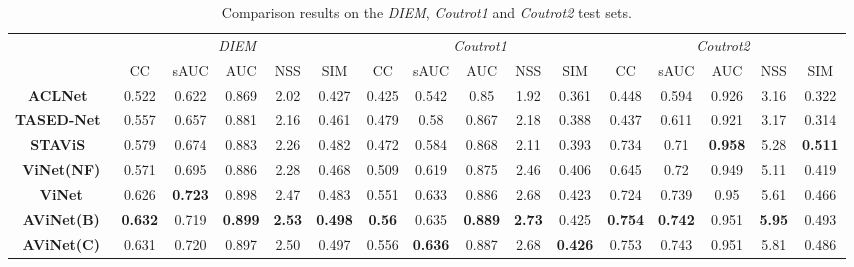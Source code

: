 \documentclass[letterpaper, 10 pt, conference]{ieeeconf}  \usepackage{times}
\begin{document}
\begin{table*}[t]
\footnotesize
\begin{center}

\begin{tabular}{|c|ccccc|ccccc|ccccc|}
\hline
 & \multicolumn{5}{c|}{\emph{DIEM}} & \multicolumn{5}{c|}{\emph{Coutrot1}} & \multicolumn{5}{c|}{\emph{Coutrot2}} \\
 & CC & sAUC & AUC & NSS & SIM & CC & sAUC & AUC & NSS & SIM & CC & sAUC & AUC & NSS & SIM \\ 
 \hline\hline
\textbf{ACLNet}~\cite{wang2019revisiting} & 0.522 & 0.622 & 0.869 & 2.02 & 0.427 & 0.425 & 0.542 & 0.85 & 1.92 & 0.361 & 0.448 & 0.594 & 0.926 & 3.16 & 0.322 \\
\textbf{TASED-Net}~\cite{min2019tased} & 0.557 & 0.657 & 0.881 & 2.16 & 0.461 & 0.479 & 0.58 & 0.867 & 2.18 & 0.388 & 0.437 & 0.611 & 0.921 & 3.17 & 0.314 \\
\textbf{STAViS}~\cite{tsiami2020stavis} & 0.579 & 0.674 & 0.883 & 2.26 & 0.482 & 0.472 & 0.584 & 0.868 & 2.11 & 0.393 & 0.734 & 0.71 & \textbf{0.958} & 5.28 & \textbf{0.511} \\
\hline
\textbf{ViNet(NF)} & 0.571 & 0.695 & 0.886 & 2.28 & 0.468 & 0.509 & 0.619 & 0.875 & 2.46 & 0.406 & 0.645 & 0.72 & 0.949 & 5.11 & 0.419 \\
\textbf{ViNet} & 0.626 & \textbf{0.723} & 0.898 & 2.47 & 0.483 & 0.551 & 0.633 & 0.886 & 2.68 & 0.423 & 0.724 & 0.739 & 0.95 & 5.61 & 0.466 \\
\textbf{AViNet(B)} & \textbf{0.632} & 0.719 & \textbf{0.899} & \textbf{2.53} & \textbf{0.498} & \textbf{0.56} & 0.635 & \textbf{0.889} & \textbf{2.73} & 0.425 & \textbf{0.754} & \textbf{0.742} & 0.951 & \textbf{5.95} & 0.493 \\ 
\textbf{AViNet(C)} & 0.631&	0.720&	0.897&	2.50&	0.497 &0.556&	\textbf{0.636}&	0.887&	2.68&	\textbf{0.426} & 0.753&	0.743&	0.951&	5.81&	0.486 \\ \hline
\end{tabular}
\end{center}
\caption{Comparison results on the \emph{DIEM}, \emph{Coutrot1} and \emph{Coutrot2} test sets.}
\label{table:audio_test_results1}
\end{table*}
\end{document}
